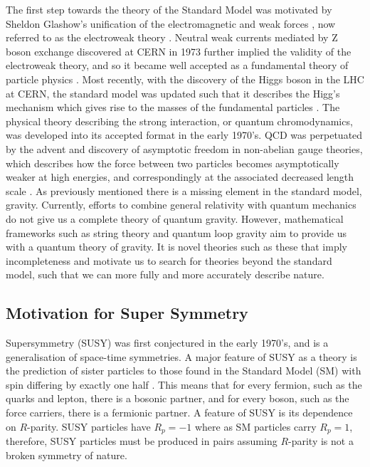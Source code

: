 \documentclass[11pt, oneside]{article}
\begin{document}
The first step towards the theory of the Standard Model was motivated by Sheldon Glashow's unification of the electromagnetic and weak forces \cite{glashow1961partial}, now referred to as the electroweak theory \cite{glashow1959renormalizability, salam1994weak}.
Neutral weak currents mediated by Z boson exchange discovered at CERN in 1973 further implied the validity of the electroweak theory, and so it became well accepted as a fundamental theory of particle physics \cite{hasert1973search, hasert1973searcha, hasert1974observation, haidt2004discovery}.
Most recently, with the discovery of the Higgs boson in the LHC at CERN, the standard model was updated such that it describes the Higg's mechanism which gives rise to the masses of the fundamental particles \cite{aad2012observation, chatrchyan2012observation, higgs1964broken, englert1964broken, anderson1963plasmons}.
The physical theory describing the strong interaction, or quantum chromodynamics, was developed into its accepted format in the early 1970's.
QCD was perpetuated by the advent and discovery of asymptotic freedom in non-abelian gauge theories, which describes how the force between two particles becomes asymptotically weaker at high energies, and correspondingly at the associated decreased length scale \cite{gross1973ultraviolet, politzer1973reliable}.
As previously mentioned there is a missing element in the standard model, gravity.
Currently, efforts to combine general relativity with quantum mechanics do not give us a complete theory of quantum gravity. However, mathematical frameworks such as string theory and quantum loop gravity aim to provide us with a quantum theory of gravity.
It is novel theories such as these that imply incompleteness and motivate us to search for theories beyond the standard model, such that we can more fully and more accurately describe nature.

\subsection{Motivation for Super Symmetry}

Supersymmetry (SUSY) was first conjectured in the early 1970's, and is a generalisation of space-time symmetries.
A major feature of SUSY as a theory is the prediction of sister particles to those found in the Standard Model (SM) with spin differing by exactly one half \cite{gol1989extension, volkov1973neutrino, wess1974supergauge, wess1974supergauge1, ferrara1974supergauge, salam1974super}.
This means that for every fermion, such as the quarks and lepton, there is a bosonic partner, and for every boson, such as the force carriers, there is a fermionic partner.
A feature of SUSY is its dependence on $R$-parity. 
SUSY particles have $R_{p}=-1$ where as SM particles carry $R_{p}=1$, therefore, SUSY particles must be produced in pairs assuming $R$-parity is not a broken symmetry of nature.
\end{document}
